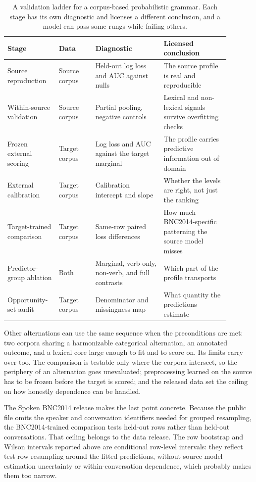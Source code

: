 \begin{table}[htbp]
\centering
\small
\begin{tabular}{>{\raggedright\arraybackslash}p{0.19\linewidth}>{\raggedright\arraybackslash}p{0.15\linewidth}>{\raggedright\arraybackslash}p{0.28\linewidth}>{\raggedright\arraybackslash}p{0.27\linewidth}}
\toprule
Stage & Data & Diagnostic & Licensed conclusion \\
\midrule
Source reproduction & Source corpus & Held-out log loss and AUC against nulls & The source profile is real and reproducible \\
Within-source validation & Source corpus & Partial pooling, negative controls & Lexical and non-lexical signals survive overfitting checks \\
Frozen external scoring & Target corpus & Log loss and AUC against the target marginal & The profile carries predictive information out of domain \\
External calibration & Target corpus & Calibration intercept and slope & Whether the levels are right, not just the ranking \\
Target-trained comparison & Target corpus & Same-row paired loss differences & How much BNC2014-specific patterning the source model misses \\
Predictor-group ablation & Both & Marginal, verb-only, non-verb, and full contrasts & Which part of the profile transports \\
Opportunity-set audit & Target corpus & Denominator and missingness map & What quantity the predictions estimate \\
\bottomrule
\end{tabular}
\caption{A validation ladder for a corpus-based probabilistic grammar. Each
stage has its own diagnostic and licenses a different conclusion, and a model
can pass some rungs while failing others.}
\label{tab:validation-ladder}
\end{table}

Other alternations can use the same sequence when the preconditions are met: two
corpora sharing a harmonizable categorical alternation, an annotated outcome,
and a lexical core large enough to fit and to score on. Its limits carry over
too. The comparison is testable only where the corpora intersect, so the
periphery of an alternation goes unevaluated; preprocessing learned on the
source has to be frozen before the target is scored; and the released data set
the ceiling on how honestly dependence can be handled.

The Spoken BNC2014 release makes the last point concrete. Because the public
file omits the speaker and conversation identifiers needed for grouped
resampling, the BNC2014-trained comparison tests held-out rows rather than
held-out conversations. That ceiling belongs to the data release. The row
bootstrap and Wilson intervals reported above are conditional row-level
intervals: they reflect test-row resampling around the fitted predictions,
without source-model estimation uncertainty or within-conversation dependence,
which probably makes them too narrow.

